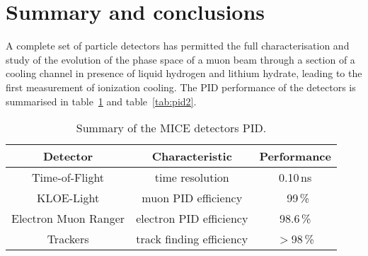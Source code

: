 \graphicspath{{80-Conclusions/Figures/}}

\section{Summary and conclusions}
\label{Sect:Conclusions}

A complete set of particle detectors has permitted the full characterisation and study of the evolution of the phase space of a muon beam through a section of a cooling channel in presence of liquid hydrogen and lithium hydrate, leading to the first measurement of ionization cooling.
The PID performance of the detectors is summarised in table~\ref{tab:pid1} and table~\ref{tab:pid2}.

\begin{table}[htb!]
	\caption{Summary of the MICE detectors PID.}
  \begin{center}
	\begin{tabular}{c|c|c}
	  \textbf{Detector}              & \textbf{Characteristic}            & \textbf{Performance} \\
		\hline
    Time-of-Flight        & time resolution           & 0.10\,ns    \\
    KLOE-Light            & muon PID efficiency       & ~99\,\%       \\
    Electron Muon Ranger  & electron PID efficiency   & 98.6\,\%      \\
    Trackers              & track finding efficiency  & $>$98\,\%     \\
  \end{tabular}
	\label{tab:pid1}
  \end{center}
\end{table}

